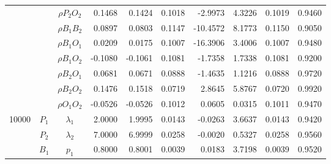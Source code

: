 \documentclass[letterpaper]{article}
\begin{document}
\begin{table}[h]
\begin{tabular}{cccrrrrrrr}
            &             & $\rho{P_2O_2}$ & 0.1468                 & 0.1424                 & 0.1018                 & -2.9973                & 4.3226                 & 0.1019                   & 0.9460                 \\
            &             & $\rho{B_1B_2}$ & 0.0897                 & 0.0803                 & 0.1147                 & -10.4572               & 8.1773                 & 0.1150                   & 0.9050                 \\
            &             & $\rho{B_1O_1}$ & 0.0209                 & 0.0175                 & 0.1007                 & -16.3906               & 3.4006                 & 0.1007                   & 0.9480                 \\
            &             & $\rho{B_1O_2}$ & -0.1080                & -0.1061                & 0.1081                 & -1.7358                & 1.7338                 & 0.1081                   & 0.9200                 \\
            &             & $\rho{B_2O_1}$ & 0.0681                 & 0.0671                 & 0.0888                 & -1.4635                & 1.1216                 & 0.0888                   & 0.9720                 \\
            &             & $\rho{B_2O_2}$ & 0.1476                 & 0.1518                 & 0.0719                 & 2.8645                 & 5.8767                 & 0.0720                   & 0.9920                 \\
            &             & $\rho{O_1O_2}$ & -0.0526                & -0.0526                & 0.1012                 & 0.0605                 & 0.0315                 & 0.1011                   & 0.9470                 \\ \hline
10000       & $P_1$       & $\lambda_1$    & 2.0000                 & 1.9995                 & 0.0143                 & -0.0263                & 3.6637                 & 0.0143                   & 0.9420                 \\
            & $P_2$       & $\lambda_2$    & 7.0000                 & 6.9999                 & 0.0258                 & -0.0020                & 0.5327                 & 0.0258                   & 0.9560                 \\
            & $B_1$       & $p_1$          & 0.8000                 & 0.8001                 & 0.0039                 & 0.0183                 & 3.7198                 & 0.0039                   & 0.9520                 \\

\end{tabular}
\end{table}
\end{document}
